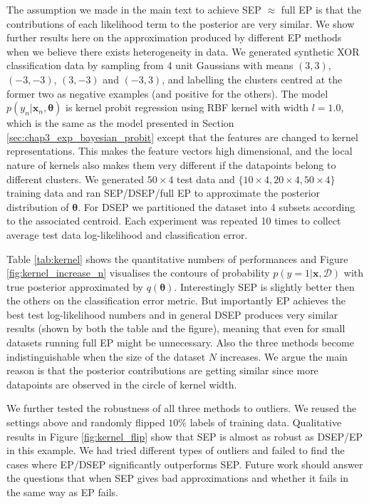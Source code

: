 The assumption we made in the main text to achieve SEP $\approx$ full EP is that the contributions of each likelihood term to the posterior are very similar. We show further results here on the approximation produced by different EP methods when we believe there exists heterogeneity in data.
%
We generated synthetic XOR classification data by sampling from 4 unit Gaussians with means $(3, 3)$, $(-3, -3)$, $(3, -3)$ and $(-3, 3)$, and labelling the clusters centred at the former two as negative examples (and positive for the others). The model $p(y_n|\bm{x}_n, \bm{\theta})$ is kernel probit regression using RBF kernel with width $l=1.0$, which is the same as the model presented in Section \ref{sec:chap3_exp_bayesian_probit} except that the features are changed to kernel representations. This makes the feature vectors high dimensional, and the local nature of kernels also makes them very different if the datapoints belong to different clusters. We generated $50 \times 4$ test data and $\{10 \times 4, 20 \times 4, 50 \times 4\}$ training data and ran SEP/DSEP/full EP to approximate the posterior distribution of $\bm{\theta}$. For DSEP we partitioned the dataset into 4 subsets according to the associated centroid. Each experiment was repeated 10 times to collect average test data log-likelihood and classification error.

Table \ref{tab:kernel} shows the quantitative numbers of performances and Figure \ref{fig:kernel_increase_n} visualises the contours of probability $p(y = 1|\bm{x}, \mathcal{D})$ with true posterior approximated by $q(\bm{\theta})$. Interestingly SEP is slightly better then the others on the classification error metric. But importantly EP achieves the best test log-likelihood numbers and in general DSEP produces very similar results (shown by both the table and the figure), meaning that even for small datasets running full EP might be unnecessary. Also the three methods become indistinguishable when the size of the dataset $N$ increases. We argue the main reason is that the posterior contributions are getting similar since more datapoints are observed in the circle of kernel width.

We further tested the robustness of all three methods to outliers. We reused the settings above and randomly flipped $10\%$ labels of training data. Qualitative results in Figure \ref{fig:kernel_flip} show that SEP is almost as robust as DSEP/EP in this example. We had tried different types of outliers and failed to find the cases where EP/DSEP significantly outperforms SEP. Future work should answer the questions that when SEP gives bad approximations and whether it fails in the same way as EP fails.


